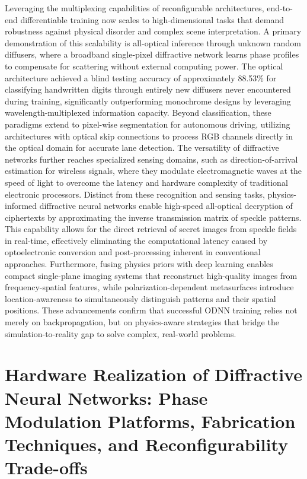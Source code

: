 Leveraging the multiplexing capabilities of reconfigurable architectures, end-to-end differentiable training now scales to high-dimensional tasks that demand robustness against physical disorder and complex scene interpretation. A primary demonstration of this scalability is all-optical inference through unknown random diffusers, where a broadband single-pixel diffractive network learns phase profiles to compensate for scattering without external computing power. The optical architecture achieved a blind testing accuracy of approximately 88.53\% for classifying handwritten digits through entirely new diffusers never encountered during training, significantly outperforming monochrome designs by leveraging wavelength-multiplexed information capacity. Beyond classification, these paradigms extend to pixel-wise segmentation for autonomous driving, utilizing architectures with optical skip connections to process RGB channels directly in the optical domain for accurate lane detection. The versatility of diffractive networks further reaches specialized sensing domains, such as direction-of-arrival estimation for wireless signals, where they modulate electromagnetic waves at the speed of light to overcome the latency and hardware complexity of traditional electronic processors. Distinct from these recognition and sensing tasks, physics-informed diffractive neural networks enable high-speed all-optical decryption of ciphertexts by approximating the inverse transmission matrix of speckle patterns. This capability allows for the direct retrieval of secret images from speckle fields in real-time, effectively eliminating the computational latency caused by optoelectronic conversion and post-processing inherent in conventional approaches. Furthermore, fusing physics priors with deep learning enables compact single-plane imaging systems that reconstruct high-quality images from frequency-spatial features, while polarization-dependent metasurfaces introduce location-awareness to simultaneously distinguish patterns and their spatial positions. These advancements confirm that successful ODNN training relies not merely on backpropagation, but on physics-aware strategies that bridge the simulation-to-reality gap to solve complex, real-world problems. \citep{doi_10_1038_s41377_023_01116_3_aba67a18} \citep{doi_10_48550_arxiv_2602_07717_16cb1c7a} \citep{doi_10_1038_s41377_024_01511_4_2538a27d} \citep{doi_10_1364_oe_579297_3ffb4db0} \citep{doi_10_1117_12_3086084_f1b734fa} \citep{doi_10_1117_1_apn_5_1_016010_3e30c230}

\section{Hardware Realization of Diffractive Neural Networks: Phase Modulation Platforms, Fabrication Techniques, and Reconfigurability Trade-offs}\label{hardware-realization-of-diffractive-neural-networks-phase-modulation-platforms-fabrication-techniques-and-reconfigurability-trade-offs}

